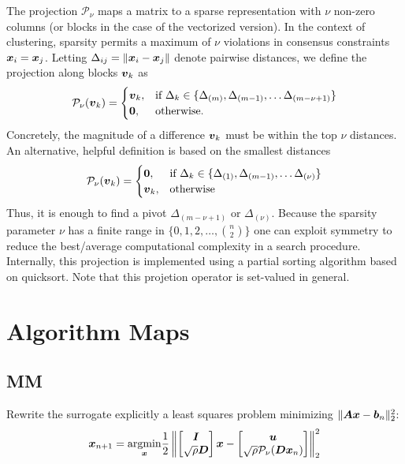 \documentclass[11pt]{article}
\begin{document}
The projection $\mathcal{P}_{\nu}$ maps a matrix to a sparse representation with $\nu$ non-zero columns (or blocks in the case of the vectorized version).
In the context of clustering, sparsity permits a maximum of $\nu$ violations in consensus constraints $\boldsymbol{x}_{i} = \boldsymbol{x}_{j}$.
Letting $\Delta_{ij} = \|\boldsymbol{x}_{i} - \boldsymbol{x}_{j}\|$ denote pairwise distances, we define the projection along blocks $\boldsymbol{v}_{k}$ as
\begin{align*}
    \mathcal{P}_{\nu}(\boldsymbol{v}_{k})
    =
    \begin{cases}
        \boldsymbol{v}_{k}, & \text{if}~\Delta_{k} \in \{\Delta_{(m)}, \Delta_{(m-1)}, \ldots \Delta_{(m-\nu+1)}\} \\
        \boldsymbol{0}, & \text{otherwise}.
    \end{cases}
\end{align*}
Concretely, the magnitude of a difference $\boldsymbol{v}_{k}$ must be within the top $\nu$ distances.
An alternative, helpful definition is based on the smallest distances
\begin{align*}
    \mathcal{P}_{\nu}(\boldsymbol{v}_{k})
    =
    \begin{cases}
        \boldsymbol{0}, & \text{if}~\Delta_{k} \in \{\Delta_{(1)}, \Delta_{(m-1)}, \ldots \Delta_{(\nu)}\} \\
        \boldsymbol{v}_{k}, & \text{otherwise}
    \end{cases}
\end{align*}
Thus, it is enough to find a pivot $\Delta_{(m-\nu+1)}$ or $\Delta_{(\nu)}$.
Because the sparsity parameter $\nu$ has a finite range in $\{0,1,2,\ldots,\binom{n}{2}\}$ one can exploit symmetry to reduce the best/average computational complexity in a search procedure.
Internally, this projection is implemented using a partial sorting algorithm based on quicksort.
Note that this projetion operator is set-valued in general.

\section*{\center Algorithm Maps}

\subsection*{MM}
Rewrite the surrogate explicitly a least squares problem minimizing $\|\boldsymbol{A} \boldsymbol{x} - \boldsymbol{b}_{n}\|^{2}_{2}$:
\begin{equation*}
  \boldsymbol{x}_{n+1} = \underset{\boldsymbol{x}}{\mathop{\rm argmin}\nolimits} \frac{1}{2} \left\|
    \begin{bmatrix}
      \boldsymbol{I} \\
      \sqrt{\rho} \boldsymbol{D}
    \end{bmatrix} \boldsymbol{x}
    -
    \begin{bmatrix}
      \boldsymbol{u} \\
      \sqrt{\rho} \mathcal{P}_{\nu}(\boldsymbol{D} \boldsymbol{x}_{n})
    \end{bmatrix}
  \right\|_{2}^{2}
\end{equation*}
\end{document}
